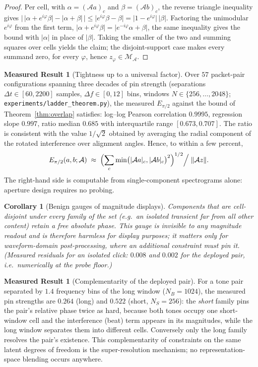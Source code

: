 \documentclass[11pt]{article}
\newtheorem{corollary}[theorem]{Corollary}
\theoremstyle{definition}
\newtheorem{measured}[theorem]{Measured Result}
\newcommand{\cA}{\mathcal{A}}
\newcommand{\cM}{\mathcal{M}}
\newcommand{\norm}[1]{\lVert #1\rVert}
\newcommand{\abs}[1]{\lvert #1\rvert}
\begin{document}
\begin{proof}
Per cell, with $\alpha=(\cA a)_{c}$ and $\beta=(\cA b)_{c}$, the reverse
triangle inequality gives
$\bigl|\,\abs{\alpha+e^{i\varphi}\beta}-\abs{\alpha+\beta}\,\bigr|
 \le\abs{e^{i\varphi}\beta-\beta}=\abs{1-e^{i\varphi}}\,\abs{\beta}$.
Factoring the unimodular $e^{i\varphi}$ from the first term,
$\abs{\alpha+e^{i\varphi}\beta}=\abs{e^{-i\varphi}\alpha+\beta}$, the same
inequality gives the bound with $\abs{\alpha}$ in place of $\abs{\beta}$.
Taking the smaller of the two and summing squares over cells yields the
claim; the disjoint-support case makes every summand zero, for every
$\varphi$, hence $z_{\varphi}\in\cM_{\cA}$.
\end{proof}

\begin{measured}[Tightness up to a universal factor]\label{meas:tight}
Over $57$ packet-pair configurations spanning three decades of pin strength
(separations $\Delta t\in[60,2200]$ samples, $\Delta f\in[0,12]$ bins,
windows $N\in\{256,\dots,2048\}$; \texttt{experiments/ladder\_theorem.py}),
the measured $E_{\pi/2}$ against the bound of Theorem~\ref{thm:overlap}
satisfies: log--log Pearson correlation $0.9995$, regression slope $0.997$,
ratio median $0.685$ with interquartile range $[0.673,0.707]$.  The ratio
is consistent with the value $1/\sqrt2$ obtained by averaging the radial
component of the rotated interference over alignment angles.  Hence, to
within a few percent,
\[
  E_{\pi/2}(a,b;\cA)\;\approx\;
  \Bigl(\sum_{c}\min\bigl(\abs{\cA a}_{c},\abs{\cA b}_{c}\bigr)^{2}\Bigr)^{1/2}
  \Big/\;\norm{\cA z} .
\]
The right-hand side is computable from single-component spectrograms alone:
aperture design requires no probing.
\end{measured}

\begin{corollary}[Benign gauges of magnitude displays]
Components that are cell-disjoint under \emph{every} family of the set
(e.g.\ an isolated transient far from all other content) retain a free
absolute phase.  This gauge is invisible to any magnitude readout and is
therefore harmless for display purposes; it matters only for
waveform-domain post-processing, where an additional constraint must pin
it.  (Measured residuals for an isolated click: $0.008$ and $0.002$ for the
deployed pair, i.e.\ numerically at the probe floor.)
\end{corollary}

\begin{measured}[Complementarity of the deployed pair]\label{meas:pair}
For a tone pair separated by $1.4$ frequency bins of the long window
($N_B=1024$), the measured pin strengths are $0.264$ (long) and $0.522$
(short, $N_S=256$): the \emph{short} family pins the pair's relative phase
twice as hard, because both tones occupy one short-window cell and the
interference (beat) term appears in its magnitudes, while the long window
separates them into different cells.  Conversely only the long family
resolves the pair's existence.  This complementarity of constraints on the
same latent degrees of freedom is the super-resolution mechanism; no
representation-space blending occurs anywhere.
\end{measured}
\end{document}
